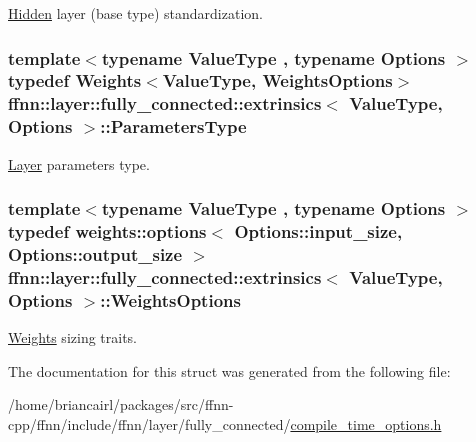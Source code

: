 \hyperlink{classffnn_1_1layer_1_1_hidden}{Hidden} layer (base type) standardization. 

\hypertarget{structffnn_1_1layer_1_1fully__connected_1_1extrinsics_a829f6f75fcd23a45225c85b7b0ac51f3}{
\subsubsection[{Parameters\-Type}]{\setlength{\rightskip}{0pt plus 5cm}template$<$typename Value\-Type , typename Options $>$ typedef {\bf Weights}$<$Value\-Type, {\bf Weights\-Options}$>$ {\bf ffnn\-::layer\-::fully\-\_\-connected\-::extrinsics}$<$ Value\-Type, Options $>$\-::{\bf Parameters\-Type}}}\label{structffnn_1_1layer_1_1fully__connected_1_1extrinsics_a829f6f75fcd23a45225c85b7b0ac51f3}


\hyperlink{classffnn_1_1layer_1_1_layer}{Layer} parameters type. 

\hypertarget{structffnn_1_1layer_1_1fully__connected_1_1extrinsics_a5f0107c20e71b4a7bd365fba7c671155}{
\subsubsection[{Weights\-Options}]{\setlength{\rightskip}{0pt plus 5cm}template$<$typename Value\-Type , typename Options $>$ typedef {\bf weights\-::options}$<$ Options\-::input\-\_\-size, Options\-::output\-\_\-size $>$ {\bf ffnn\-::layer\-::fully\-\_\-connected\-::extrinsics}$<$ Value\-Type, Options $>$\-::{\bf Weights\-Options}}}\label{structffnn_1_1layer_1_1fully__connected_1_1extrinsics_a5f0107c20e71b4a7bd365fba7c671155}


\hyperlink{classffnn_1_1layer_1_1fully__connected_1_1_weights}{Weights} sizing traits. 



The documentation for this struct was generated from the following file\-:\begin{DoxyCompactItemize}
\item 
/home/briancairl/packages/src/ffnn-\/cpp/ffnn/include/ffnn/layer/fully\-\_\-connected/\hyperlink{fully__connected_2compile__time__options_8h}{compile\-\_\-time\-\_\-options.\-h}\end{DoxyCompactItemize}
